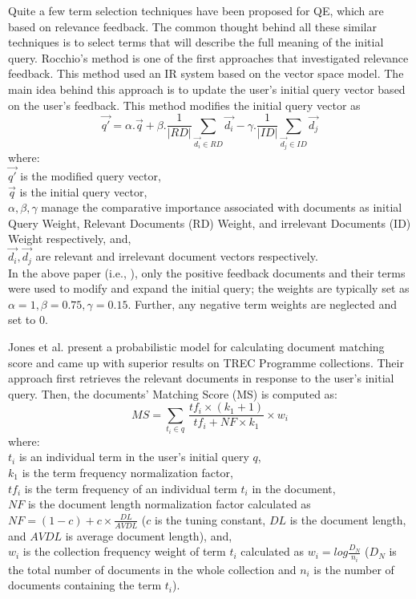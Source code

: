 Quite a few term selection techniques have been proposed for QE, which are based on relevance feedback. The common thought behind all these similar techniques is to select terms that will describe the full meaning of the initial query. Rocchio's method \cite{rocchio1971relevance} is one of the first approaches that investigated relevance feedback. This method used an IR system based on the vector space model. The main idea behind this approach is to update the user's initial query vector based on the user's feedback. This method modifies the initial query vector as
\begin{equation}
\overrightarrow{q'}= \alpha .\overrightarrow{q} + \beta .\frac{1}{|RD|}\sum_{\overrightarrow{d_i}\in RD} \overrightarrow{d_i} - \gamma .\frac{1}{|ID|} \sum_{\overrightarrow{d_j}\in ID} \overrightarrow{d_j}
\end{equation}
where:\\
$\overrightarrow{q'}$ is the modified query vector, \\
$\overrightarrow{q}$ is the initial query vector, \\
$\alpha,\beta,\gamma$ manage the comparative importance associated with documents as initial Query  Weight, Relevant Documents (RD) Weight, and irrelevant Documents (ID) Weight respectively, and,\\
$\overrightarrow{d_i},\overrightarrow{d_j}$ are relevant and irrelevant document vectors respectively. \\
In the above paper (i.e.,  \cite{rocchio1971relevance}), only the positive feedback documents and their terms were used to modify and expand the initial query; the weights are typically set as $\alpha=1, \beta=0.75,\gamma=0.15$. Further,  any negative term weights are neglected and set to 0. 

Jones et al. \cite{jones2000probabilistic} present a probabilistic model for calculating document matching score and came up with superior results on TREC Programme collections. Their approach first  retrieves the relevant documents in response to the user's initial query. Then, the documents' Matching Score (MS) is computed as:
\begin{equation}
MS= \sum_{t_i\in q}\,\frac{tf_i \times (k_1+ 1)}{tf_i+NF\times k_1}\times w_i
\end{equation}
where: \\
$t_i$ is an individual term in the user's initial query $q$,\\
$k_1$ is the term frequency normalization factor,\\
$tf_i$ is the term frequency of an individual term $t_i$ in the document,\\ 
$NF$ is the document length normalization factor calculated as $NF= (1-c)+c\times \frac{DL}{AVDL} $ ($c$ is the tuning constant, $DL$ is the document length, and $AVDL$ is average document length), and,\\
$w_i$ is the collection frequency weight of term $t_i$ calculated as $w_i= log \frac{D_N}{n_i}$ ($D_N$ is the total number of documents in the whole collection and $n_i$ is the number of documents containing the term $t_i$). 


